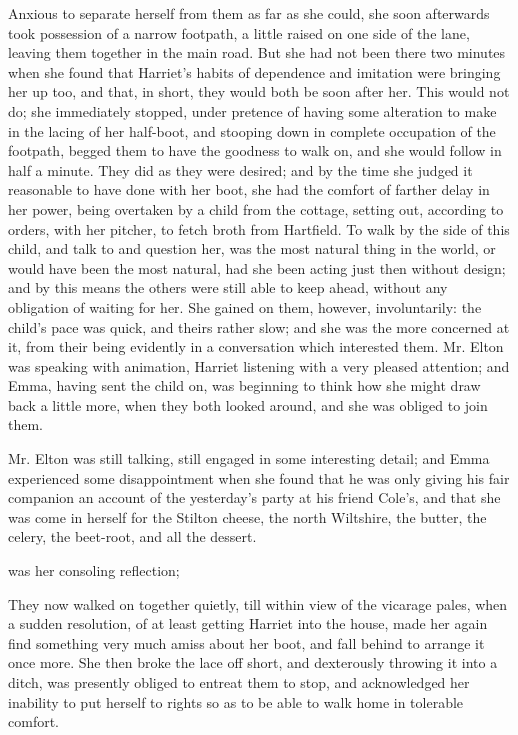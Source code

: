 Anxious to separate herself from them as far as she could, she soon afterwards took possession of a narrow footpath, a little raised on one side of the lane, leaving them together in the main road. But she had not been there two minutes when she found that Harriet's habits of dependence and imitation were bringing her up too, and that, in short, they would both be soon after her. This would not do; she immediately stopped, under pretence of having some alteration to make in the lacing of her half-boot, and stooping down in complete occupation of the footpath, begged them to have the goodness to walk on, and she would follow in half a minute. They did as they were desired; and by the time she judged it reasonable to have done with her boot, she had the comfort of farther delay in her power, being overtaken by a child from the cottage, setting out, according to orders, with her pitcher, to fetch broth from Hartfield. To walk by the side of this child, and talk to and question her, was the most natural thing in the world, or would have been the most natural, had she been acting just then without design; and by this means the others were still able to keep ahead, without any obligation of waiting for her. She gained on them, however, involuntarily: the child's pace was quick, and theirs rather slow; and she was the more concerned at it, from their being evidently in a conversation which interested them. Mr. Elton was speaking with animation, Harriet listening with a very pleased attention; and Emma, having sent the child on, was beginning to think how she might draw back a little more, when they both looked around, and she was obliged to join them.

Mr. Elton was still talking, still engaged in some interesting detail; and Emma experienced some disappointment when she found that he was only giving his fair companion an account of the yesterday's party at his friend Cole's, and that she was come in herself for the Stilton cheese, the north Wiltshire, the butter, the celery, the beet-root, and all the dessert.

 was her consoling reflection; 

They now walked on together quietly, till within view of the vicarage pales, when a sudden resolution, of at least getting Harriet into the house, made her again find something very much amiss about her boot, and fall behind to arrange it once more. She then broke the lace off short, and dexterously throwing it into a ditch, was presently obliged to entreat them to stop, and acknowledged her inability to put herself to rights so as to be able to walk home in tolerable comfort.

